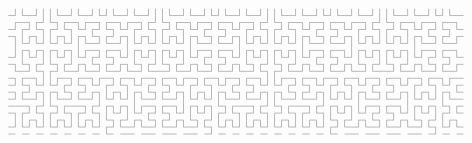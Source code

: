 $$
\hbox
{
\vbox{\lineskip = 0pt \baselineskip = 0pt
      \hbox{\z\j\l\z\j\j\j\l\z\j\l\z\j\l\j\l\z\j\l\z\j\j\j\l\z\j\l\z\j\l\j\l\z\j\l\z\j\j\j\l\z\j\l\z\j\l\j\l\z\j\l\z\j\j\j\l\z\j\l\z\j\l\j\l\z}
      \hbox{\n\z\z\o\z\j\l\o\z\z\o\z\z\o\z\z\o\z\z\o\z\j\l\o\z\z\o\z\z\o\z\z\o\z\z\o\z\j\l\o\z\z\o\z\z\o\z\z\o\z\z\o\z\j\l\o\z\z\o\z\z\o\z\z\o}
      \hbox{\z\j\z\j\l\o\z\j\l\o\l\j\z\j\l\o\l\j\z\j\l\o\z\j\l\o\l\j\z\j\l\o\l\j\z\j\l\o\z\j\l\o\l\j\z\j\l\o\l\j\z\j\l\o\z\j\l\o\l\j\z\j\l\o\l}
      \hbox{\z\o\j\z\o\j\j\z\o\j\z\o\l\o\z\j\z\o\j\z\o\j\j\z\o\j\z\o\l\o\z\j\z\o\j\z\o\j\j\z\o\j\z\o\l\o\z\j\z\o\j\z\o\j\j\z\o\j\z\o\l\o\z\j\z}
      \hbox{\n\j\l\j\l\j\l\j\l\j\j\l\z\j\l\z\j\j\l\j\l\j\l\j\l\j\j\l\z\j\l\z\j\j\l\j\l\j\l\j\l\j\j\l\z\j\l\z\j\j\l\j\l\j\l\j\l\j\j\l\z\j\l\z\j}
      \hbox{\n\j\z\o\z\o\z\o\z\o\j\z\z\o\z\z\o\j\z\o\z\o\z\o\z\o\j\z\z\o\z\z\o\j\z\o\z\o\z\o\z\o\j\z\z\o\z\z\o\j\z\o\z\o\z\o\z\o\j\z\z\o\z\z\o}
      \hbox{\z\j\j\l\j\j\j\l\j\j\l\j\z\j\l\o\l\j\j\l\j\j\j\l\j\j\l\j\z\j\l\o\l\j\j\l\j\j\j\l\j\j\l\j\z\j\l\o\l\j\j\l\j\j\j\l\j\j\l\j\z\j\l\o\l}
      \hbox{\z\o\l\o\z\j\l\o\z\j\z\o\l\o\z\j\z\o\l\o\z\j\l\o\z\j\z\o\l\o\z\j\z\o\l\o\z\j\l\o\z\j\z\o\l\o\z\j\z\o\l\o\z\j\l\o\z\j\z\o\l\o\z\j\z}
      \hbox{\n\l\z\j\l\o\z\j\l\z\j\l\z\j\l\z\j\l\z\j\l\z\z\j\l\z\j\l\z\j\l\z\j\l\z\j\l\o\z\j\l\z\j\l\z\j\l\z\j\l\z\j\l\z\z\j\l\z\j\l\z\j\l\z\j}
      \hbox{\z\o\z\z\o\j\j\z\z\o\z\z\o\z\z\o\z\z\o\z\z\o\z\z\o\z\z\o\z\z\o\z\z\o\z\z\o\j\j\z\z\o\z\z\o\z\z\o\z\z\o\z\z\o\z\z\o\z\z\o\z\z\o\z\z}
      \hbox{\z\j\l\o\l\j\l\j\z\j\l\o\l\j\z\j\l\o\l\j\z\j\l\o\l\j\z\j\l\o\l\j\z\j\l\o\l\j\l\j\z\j\l\o\l\j\z\j\l\o\l\j\z\j\l\o\l\j\z\j\l\o\l\j\z}
      \hbox{\z\o\z\j\z\o\z\o\l\o\z\j\z\o\j\z\o\j\z\o\l\o\z\j\z\o\j\z\o\j\z\o\l\o\z\j\z\o\z\o\l\o\z\j\z\o\j\z\o\j\z\o\l\o\z\j\z\o\j\z\o\j\z\o\l}
      \hbox{\z\j\l\z\j\j\j\l\z\j\l\z\j\j\l\j\l\j\j\l\z\j\l\z\j\j\l\j\l\j\j\l\z\j\l\z\j\j\j\l\z\j\l\z\j\j\l\j\l\j\j\l\z\j\l\z\j\j\l\j\l\j\j\l\z}
      \hbox{\z\z\z\o\z\j\l\o\z\z\z\o\z\j\z\o\z\o\j\z\z\o\z\z\o\j\z\o\z\o\l\o\z\z\z\o\z\j\l\o\z\z\z\o\z\j\z\o\z\o\j\z\z\o\z\z\o\j\z\o\z\o\l\o\z}
      \hbox{\z\o\z\j\l\o\z\j\l\o\z\j\l\o\j\l\j\j\l\j\z\j\l\o\l\j\j\l\j\j\z\j\l\o\z\j\l\o\z\j\l\o\z\j\l\o\j\l\j\j\l\j\z\j\l\o\l\j\j\l\j\j\z\j\l}
      \hbox{\n\j\j\z\o\j\j\z\o\j\j\z\o\j\l\o\z\j\z\o\l\o\z\j\z\o\l\o\z\j\j\z\o\j\j\z\o\j\j\z\o\j\j\z\o\j\l\o\z\j\z\o\l\o\z\j\z\o\l\o\z\j\j\z\o}
      \hbox{\z\j\l\j\l\j\l\j\l\j\l\j\l\j\z\j\l\z\j\l\z\j\l\z\j\l\z\j\l\o\l\j\l\j\l\j\l\j\l\j\l\j\l\j\l\j\z\j\l\z\j\l\z\j\l\z\j\l\z\j\l\o\l\j\l}
      \hbox{\z\o\z\o\z\o\z\o\z\o\z\o\z\o\l\o\z\z\o\z\z\o\z\z\o\z\z\o\z\j\z\o\z\o\z\o\z\o\z\o\z\o\z\o\z\o\l\o\z\z\o\z\z\o\z\z\o\z\z\o\z\j\z\o\z}
}}$$
